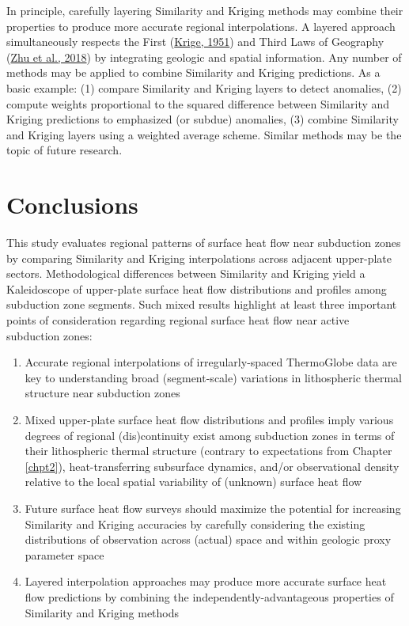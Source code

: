 In principle, carefully layering Similarity and Kriging methods may combine their properties to produce more accurate regional interpolations. A layered approach simultaneously respects the First (\protect\hyperlink{ref-krige1951}{Krige, 1951}) and Third Laws of Geography (\protect\hyperlink{ref-zhu2018}{Zhu et al., 2018}) by integrating geologic and spatial information. Any number of methods may be applied to combine Similarity and Kriging predictions. As a basic example: (1) compare Similarity and Kriging layers to detect anomalies, (2) compute weights proportional to the squared difference between Similarity and Kriging predictions to emphasized (or subdue) anomalies, (3) combine Similarity and Kriging layers using a weighted average scheme. Similar methods may be the topic of future research.

\hypertarget{conclusions-1}{%
\section{Conclusions}\label{conclusions-1}}

This study evaluates regional patterns of surface heat flow near subduction zones by comparing Similarity and Kriging interpolations across adjacent upper-plate sectors. Methodological differences between Similarity and Kriging yield a Kaleidoscope of upper-plate surface heat flow distributions and profiles among subduction zone segments. Such mixed results highlight at least three important points of consideration regarding regional surface heat flow near active subduction zones:

\begin{enumerate}
\def\labelenumi{\arabic{enumi}.}
\tightlist
\item
  Accurate regional interpolations of irregularly-spaced ThermoGlobe data are key to understanding broad (segment-scale) variations in lithospheric thermal structure near subduction zones
\item
  Mixed upper-plate surface heat flow distributions and profiles imply various degrees of regional (dis)continuity exist among subduction zones in terms of their lithospheric thermal structure (contrary to expectations from Chapter \ref{chpt2}), heat-transferring subsurface dynamics, and/or observational density relative to the local spatial variability of (unknown) surface heat flow
\item
  Future surface heat flow surveys should maximize the potential for increasing Similarity and Kriging accuracies by carefully considering the existing distributions of observation across (actual) space and within geologic proxy parameter space
\item
  Layered interpolation approaches may produce more accurate surface heat flow predictions by combining the independently-advantageous properties of Similarity and Kriging methods
\end{enumerate}

